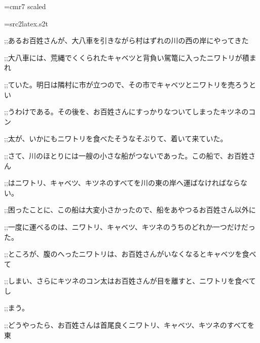 \documentclass{article}
\begin{document}
\ifx\sevenrm\undefined
  \font\sevenrm=cmr7 scaled 
\fi

\newread\MyStyle
\openin\MyStyle=src2latex.s2t
\ifeof\MyStyle
  \closein\MyStyle
\else
  
  \closein\MyStyle
\fi

\def\mc{\relax}
\def\gt{\relax}
\def\sc{\scshape}

\tt\mc 

\noindent
\rm\mc \hfill

\noindent
\mbox{}\bf %

\noindent
\mbox{};;\charwd [問題]\charwd あるお百姓さんが、大八車を引きながら村はずれの川の西の岸にやってきた

\noindent
\mbox{};;\charwd 大八車には、荒縄でくくられたキャベツと背負い駕篭に入ったニワトリが積まれ

\noindent
\mbox{};;\charwd ていた。明日は隣村に市が立つので、その市でキャベツとニワトリを売ろうとい

\noindent
\mbox{};;\charwd うわけである。その後を、お百姓さんにすっかりなついてしまったキツネのコン

\noindent
\mbox{};;\charwd 太が、いかにもニワトリを食べたそうなそぶりて、着いて来ていた。

\noindent
\mbox{}\rm\mc %

\noindent
\mbox{};;\charwd さて、川のほとりには一艘の小さな船がつないであった。この船で、お百姓さん

\noindent
\mbox{};;\charwd はニワトリ、キャベツ、キツネのすべてを川の東の岸へ運ばなければならない。

\noindent
\mbox{};;\charwd 困ったことに、この船は大変小さかったので、船をあやつるお百姓さん以外に

\noindent
\mbox{};;\charwd 一度に運べるのは、ニワトリ、キャベツ、キツネのうちのどれか一つだけだった。

\noindent
\mbox{};;\charwd ところが、腹のへったニワトリは、お百姓さんがいなくなるとキャベツを食べて

\noindent
\mbox{};;\charwd しまい、さらにキツネのコン太はお百姓さんが目を離すと、ニワトリを食べてし

\noindent
\mbox{};;\charwd まう。

\noindent
\mbox{}\bf %

\noindent
\mbox{};;\charwd どうやったら、お百姓さんは首尾良くニワトリ、キャベツ、キツネのすべてを東
\end{document}
